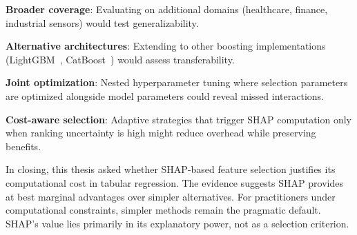 \textbf{Broader coverage}: Evaluating on additional domains (healthcare, finance, industrial sensors) would test generalizability.

\textbf{Alternative architectures}: Extending to other boosting implementations (LightGBM~\cite{ke2017lightgbm}, CatBoost~\cite{prokhorenkova2018catboost}) would assess transferability.

\textbf{Joint optimization}: Nested hyperparameter tuning where selection parameters are optimized alongside model parameters could reveal missed interactions.

\textbf{Cost-aware selection}: Adaptive strategies that trigger SHAP computation only when ranking uncertainty is high might reduce overhead while preserving benefits.

In closing, this thesis asked whether SHAP-based feature selection justifies its computational cost in tabular regression. The evidence suggests SHAP provides at best marginal advantages over simpler alternatives. For practitioners under computational constraints, simpler methods remain the pragmatic default. SHAP's value lies primarily in its explanatory power, not as a selection criterion.
